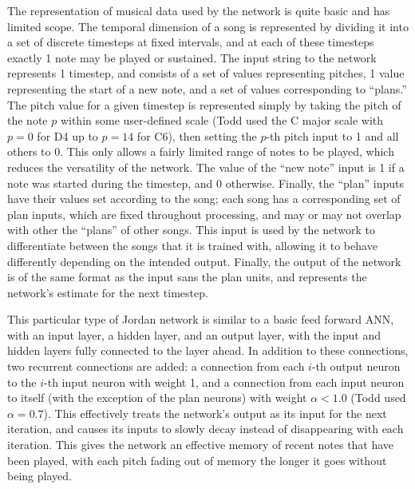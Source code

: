 \documentclass[ author={Stephen Livermore-Tozer},
				supervisor={Dr. Peter Flach},
				degree={MEng},
				title={Algorithmic Co-composition Using Machine Learning},
				subtitle={},
				type={research},
				year={2016} ]{dissertation}
\begin{document}
	The representation of musical data used by the network is quite basic and has limited scope. The temporal dimension of a song is represented by dividing it into a set of discrete timesteps at fixed intervals, and at each of these timesteps exactly 1 note may be played or sustained. The input string to the network represents 1 timestep, and consists of a set of values representing pitches, 1 value representing the start of a new note, and a set of values corresponding to ``plans.'' The pitch value for a given timestep is represented simply by taking the pitch of the note $p$ within some user-defined scale (Todd used the C major scale with $p = 0$ for D4 up to $p = 14$ for C6), then setting the $p$-th pitch input to 1 and all others to 0. This only allows a fairly limited range of notes to be played, which reduces the versatility of the network. The value of the ``new note'' input is 1 if a note was started during the timestep, and 0 otherwise. Finally, the ``plan'' inputs have their values set according to the song; each song has a corresponding set of plan inputs, which are fixed throughout processing, and may or may not overlap with other the ``plans'' of other songs. This input is used by the network to differentiate between the songs that it is trained with, allowing it to behave differently depending on the intended output. Finally, the output of the network is of the same format as the input sans the plan units, and represents the network's estimate for the next timestep.
	
	This particular type of Jordan network is similar to a basic feed forward ANN, with an input layer, a hidden layer, and an output layer, with the input and hidden layers fully connected to the layer ahead. In addition to these connections, two recurrent connections are added: a connection from each $i$-th output neuron to the $i$-th input neuron with weight 1, and a connection from each input neuron to itself (with the exception of the plan neurons) with weight $\alpha < 1.0$ (Todd used $\alpha = 0.7$). This effectively treats the network's output as its input for the next iteration, and causes its inputs to slowly decay instead of disappearing with each iteration. This gives the network an effective memory of recent notes that have been played, with each pitch fading out of memory the longer it goes without being played.
	
\end{document}
